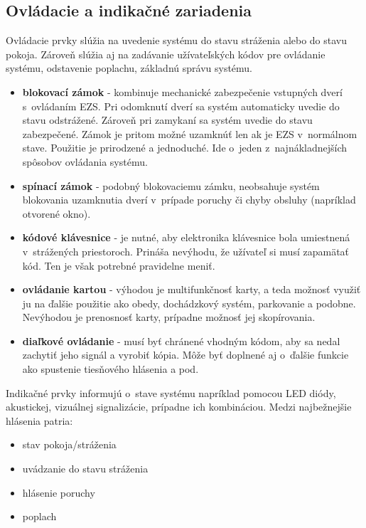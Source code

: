 \subsection{Ovládacie a indikačné zariadenia}

Ovládacie prvky slúžia na uvedenie systému do stavu stráženia alebo do stavu pokoja. Zároveň slúžia aj na zadávanie užívateľských kódov pre ovládanie systému, odstavenie poplachu, základnú správu systému.
\begin{itemize}
    \item \textbf{blokovací zámok} - kombinuje mechanické zabezpečenie vstupných dverí s~ovládaním EZS. Pri odomknutí dverí sa systém automaticky uvedie do stavu odstrážené. Zároveň pri zamykaní sa systém uvedie do stavu zabezpečené. Zámok je pritom možné uzamknúť len ak je EZS v~normálnom stave. Použitie je prirodzené a jednoduché. Ide o~jeden z~najnákladnejších spôsobov ovládania systému.
    \item \textbf{spínací zámok} - podobný blokovaciemu zámku, neobsahuje systém blokovania uzamknutia dverí v~prípade poruchy či chyby obsluhy (napríklad otvorené okno).
    \item \textbf{kódové klávesnice} - je nutné, aby elektronika klávesnice bola umiestnená v~strážených priestoroch. Prináša nevýhodu, že užívateľ si musí zapamätať kód. Ten je však potrebné pravidelne meniť.
    \item \textbf{ovládanie kartou} - výhodou je multifunkčnosť karty, a teda možnosť využiť ju na ďalšie použitie ako obedy, dochádzkový systém, parkovanie a podobne. Nevýhodou je prenosnosť karty, prípadne možnosť jej skopírovania.
    \item \textbf{diaľkové ovládanie} - musí byť chránené vhodným kódom, aby sa nedal zachytiť jeho signál a vyrobiť kópia. Môže byť doplnené aj o~ďalšie funkcie ako spustenie tiesňového hlásenia a pod.\cite{velas_ezs}
\end{itemize}

Indikačné prvky informujú o~stave systému napríklad pomocou LED diódy, akustickej, vizuálnej signalizácie, prípadne ich kombináciou. Medzi najbežnejšie hlásenia patria:
\begin{itemize}
    \item stav pokoja/stráženia
    \item uvádzanie do stavu stráženia
    \item hlásenie poruchy
    \item poplach
\end{itemize}

